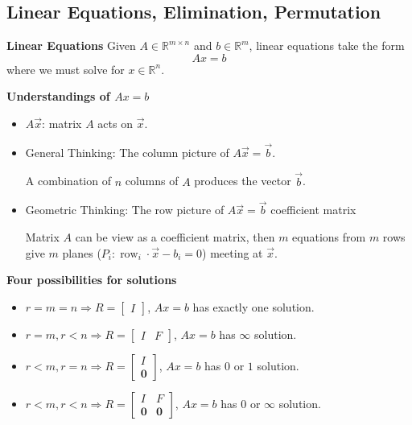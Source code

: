 \documentclass[14pt]{article}
\theoremstyle{definition}
\theoremstyle{remark}
\begin{document}
\begin{multicols}{2}
    \section{Linear Equations, Elimination, Permutation}
    \textbf{Linear Equations}
    Given $A \in \mathbb{R}^{m \times n}$ and $b \in \mathbb{R}^{m}$, linear equations take the form
    \[
        A x=b
    \]
    where we must solve for $x \in \mathbb{R}^{n}$.

    \textbf{Understandings of $Ax = b$}
    \begin{itemize}
        \item $A \vec{x}$: matrix $A$ acts on $\vec{x}$.
        \item General Thinking: The column picture of $A \vec{x}=\vec{b}$.

              A combination of $n$ columns of $A$ produces the vector $\vec{b}$.

        \item Geometric Thinking: The row picture of $A \vec{x}=\vec{b}$ coefficient matrix

              Matrix $A$ can be view as a coefficient matrix, then $m$ equations from $m$ rows give $m$ planes ($P_i: \operatorname{row}_i \cdot \vec{x}-b_i=0$) meeting at $\vec{x}$.
    \end{itemize}

    \textbf{Four possibilities for solutions}
    \begin{itemize}
        \item $r=m=n \Longrightarrow R = \begin{bmatrix}
                      I
                  \end{bmatrix}$,  $A x=b$ has exactly one solution.
        \item $r=m, r<n \Longrightarrow R = \begin{bmatrix}
                      I & F
                  \end{bmatrix}$,  $A x=b$ has $\infty$ solution.
        \item $r<m, r=n \Longrightarrow R = \begin{bmatrix}
                      I \\
                      \bm{0}
                  \end{bmatrix}$,  $A x=b$ has $0$ or $1$ solution.

        \item $r<m, r<n \Longrightarrow R = \begin{bmatrix}
                      I      & F      \\
                      \bm{0} & \bm{0}
                  \end{bmatrix}$,  $A x=b$ has $0$ or $\infty$ solution.


\end{itemize}
\end{multicols}
\end{document}
